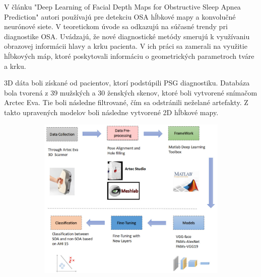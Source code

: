 V článku "Deep Learning of Facial Depth Maps for Obstructive Sleep Apnea Prediction" autori používajú pre detekciu OSA hĺbkové mapy a konvolučné neurónové siete. V teoretickom úvode sa odkazujú na súčasné trendy pri diagnostike OSA. Uvádzajú, že nové diagnostické metódy smerujú k využívaniu obrazovej informácii hlavy a krku pacienta. V ich práci sa zamerali na využitie hĺbkových máp, ktoré poskytovali informáciu o geometrických parametroch tváre a krku. 

3D dáta boli získané od pacientov, ktorí podstúpili PSG diagnostiku. Databáza bola tvorená z 39 mužských a 30 ženských skenov, ktoré boli vytvorené snímačom Arctec Eva. Tie boli následne filtrované, čím sa odstránili neželané artefakty. Z takto upravených modelov boli následne vytvorené 2D hĺbkové mapy.  

\begin{figure}[h]
	\centering
	\begin{subfigure}[b]{0.62\textwidth}
		\centering
		\includegraphics[width=\textwidth]{figures/resers_e.png}
		\caption{}
		\label{fig:resers:a}
	\end{subfigure}
	\hfill
	\begin{subfigure}[b]{0.37\textwidth}
		\centering

\end{subfigure}
\end{figure}
